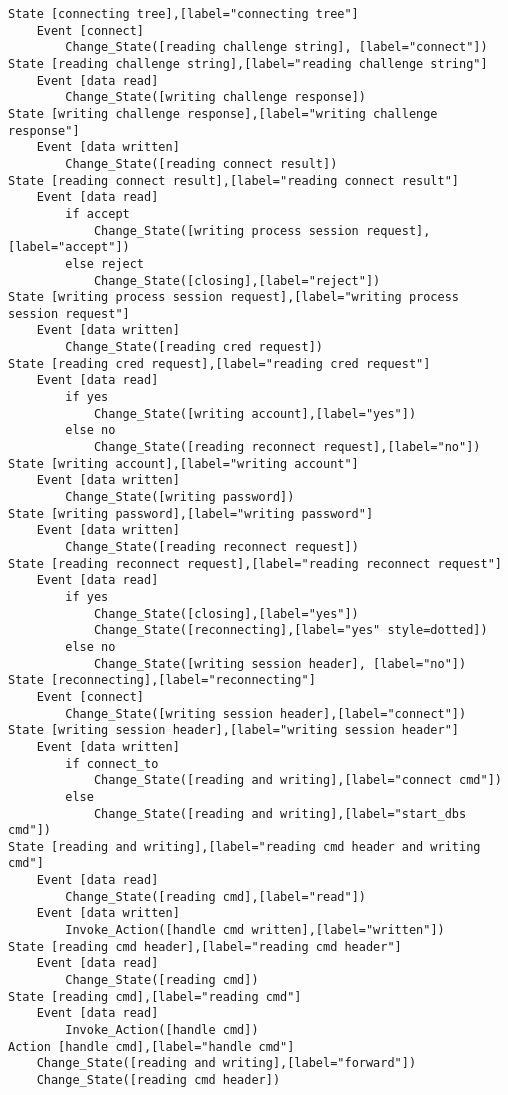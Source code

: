 \begin{comment}
This is the state machine for mpiexec for smpd.
Graph [mpiexec for smpd],
      [size="7.5, 10"]
\end{comment}
\begin{verbatim}
State [connecting tree],[label="connecting tree"]
	Event [connect]
		Change_State([reading challenge string], [label="connect"])
State [reading challenge string],[label="reading challenge string"]
	Event [data read]
		Change_State([writing challenge response])
State [writing challenge response],[label="writing challenge response"]
	Event [data written]
		Change_State([reading connect result])
State [reading connect result],[label="reading connect result"]
	Event [data read]
		if accept
			Change_State([writing process session request], [label="accept"])
		else reject
			Change_State([closing],[label="reject"])
State [writing process session request],[label="writing process session request"]
	Event [data written]
		Change_State([reading cred request])
State [reading cred request],[label="reading cred request"]
	Event [data read]
		if yes
			Change_State([writing account],[label="yes"])
		else no
			Change_State([reading reconnect request],[label="no"])
State [writing account],[label="writing account"]
	Event [data written]
		Change_State([writing password])
State [writing password],[label="writing password"]
	Event [data written]
		Change_State([reading reconnect request])
State [reading reconnect request],[label="reading reconnect request"]
	Event [data read]
		if yes
			Change_State([closing],[label="yes"])
			Change_State([reconnecting],[label="yes" style=dotted])
		else no
			Change_State([writing session header], [label="no"])
State [reconnecting],[label="reconnecting"]
	Event [connect]
		Change_State([writing session header],[label="connect"])
State [writing session header],[label="writing session header"]
	Event [data written]
		if connect_to
			Change_State([reading and writing],[label="connect cmd"])
		else
			Change_State([reading and writing],[label="start_dbs cmd"])
State [reading and writing],[label="reading cmd header and writing cmd"]
	Event [data read]
		Change_State([reading cmd],[label="read"])
	Event [data written]
		Invoke_Action([handle cmd written],[label="written"])
State [reading cmd header],[label="reading cmd header"]
	Event [data read]
		Change_State([reading cmd])
State [reading cmd],[label="reading cmd"]
	Event [data read]
		Invoke_Action([handle cmd])
Action [handle cmd],[label="handle cmd"]
	Change_State([reading and writing],[label="forward"])
	Change_State([reading cmd header])

\end{verbatim}
